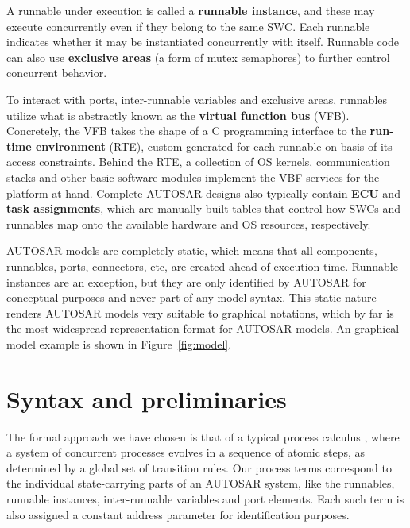\documentclass[twocolumn]{article}
\begin{document}
A runnable under execution is called a \textbf{runnable instance}, and these may execute concurrently even if they belong to the same SWC. Each runnable indicates whether it may be instantiated concurrently with itself. Runnable code can also use \textbf{exclusive areas} (a form of mutex semaphores) to further control concurrent behavior.

To interact with ports, inter-runnable variables and exclusive areas, runnables utilize what is abstractly known as the \textbf{virtual function bus} (VFB). Concretely, the VFB takes the shape of a C programming interface to the \textbf{run-time environment} (RTE), custom-generated for each runnable on basis of its access constraints. Behind the RTE, a collection of OS kernels, communication stacks and other basic software modules implement the VBF services for the platform at hand. Complete AUTOSAR designs also typically contain \textbf{ECU} and \textbf{task assignments}, which are manually built tables that control how SWCs and runnables map onto the available hardware and OS resources, respectively.

AUTOSAR models are completely static, which means that all components, runnables, ports, connectors, etc, are created ahead of execution time. Runnable instances are an exception, but they are only identified by AUTOSAR for conceptual purposes and never part of any model syntax. This static nature renders AUTOSAR models very suitable to graphical notations, which by far is the most widespread representation format for AUTOSAR models. An graphical model example is shown in Figure~\ref{fig:model}.

\section{Syntax and preliminaries}
\label{sec:Calc}

The formal approach we have chosen is that of a typical process calculus \cite{TODO}, where a system of concurrent processes evolves in a sequence of atomic steps, as determined by a global set of transition rules. Our process terms correspond to the individual state-carrying parts of an AUTOSAR system, like the runnables, runnable instances, inter-runnable variables and port elements. Each such term is also assigned a constant address parameter for identification purposes.
\end{document}
